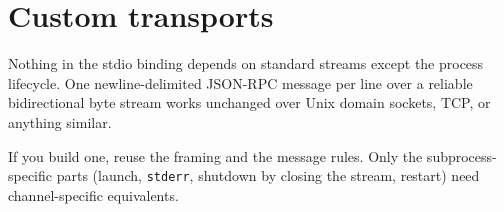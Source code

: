 \section{Custom transports}

Nothing in the stdio binding depends on standard streams except the process
lifecycle. One newline-delimited JSON-RPC message per line over a reliable
bidirectional byte stream works unchanged over Unix domain sockets, TCP, or
anything similar.

If you build one, reuse the framing and the message rules. Only the
subprocess-specific parts (launch, \texttt{stderr}, shutdown by closing the
stream, restart) need channel-specific equivalents.
